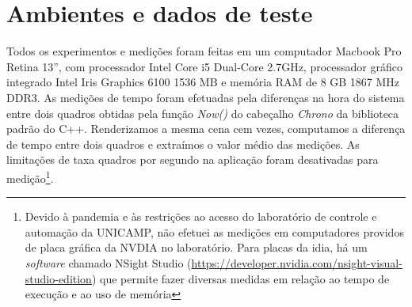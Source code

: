 \section{Ambientes e dados de teste}
\label{sec::ambientes_e_dados_de_dados}


Todos os experimentos e medições foram feitas em um computador Macbook Pro Retina 13'', com processador Intel Core i5 Dual-Core 2.7GHz, processador gráfico integrado Intel Iris Graphics 6100 1536 MB e memória RAM de 8 GB 1867 MHz DDR3.
As medições de tempo foram efetuadas pela diferenças na hora do sistema entre dois quadros obtidas pela função \textit{Now()} do cabeçalho \textit{Chrono} da biblioteca padrão do C++. Renderizamos a mesma cena cem vezes, computamos a diferença de tempo entre dois quadros e extraímos o valor médio das medições. As limitações de taxa quadros por segundo na aplicação foram desativadas para medição\footnote{Devido à pandemia e às restrições ao acesso do laboratório de controle e automação da UNICAMP, não efetuei as medições em computadores providos de placa gráfica da NVDIA no laboratório. Para placas da idia, há um \textit{software} chamado NSight Studio (\url{https://developer.nvidia.com/nsight-visual-studio-edition}) que permite fazer diversas medidas em relação ao tempo de execução e ao uso de memória}.



